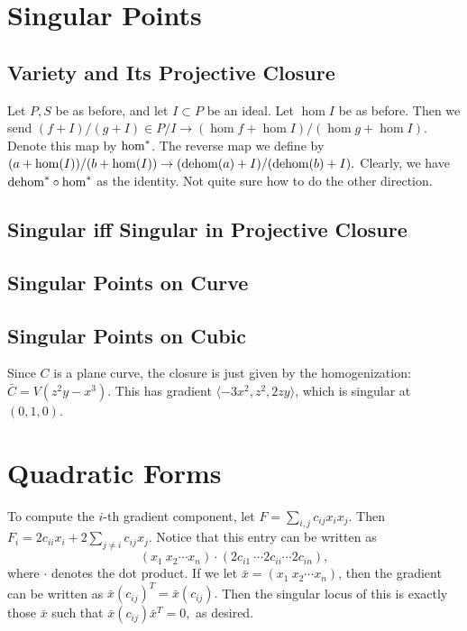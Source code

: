 \section{Singular Points}
\subsection{Variety and Its Projective Closure}
Let $P, S$ be as before, and let $I \subset P$ be an ideal. Let $\hom I$ be as before. Then we send $(f + I)/(g + I) \in P/I \rightarrow (\hom f + \hom I)/(\hom g + \hom I)$. Denote this map by $\mathrm{hom}^*$. The reverse map we define by $(a + \mathrm{hom}(I))/(b + \mathrm{hom}(I)) \rightarrow (\mathrm{dehom}(a) + I)/(\mathrm{dehom}(b) + I).$ Clearly, we have $\mathrm{dehom}^* \circ \mathrm{hom}^*$ as the identity. Not quite sure how to do the other direction.

\subsection{Singular iff Singular in Projective Closure}

\subsection{Singular Points on Curve}

\subsection{Singular Points on Cubic}
Since $C$ is a plane curve, the closure is just given by the homogenization: $\bar{C} = V(z^2 y - x^3).$ This has gradient $\langle -3x^2, z^2, 2zy \rangle$, which is singular at $(0, 1, 0)$.

\section{Quadratic Forms}
To compute the $i$-th gradient component, let $F = \sum_{i, j} c_{ij} x_i x_j$. Then $F_i = 2 c_{ii} x_i + 2 \sum_{j \neq i} c_{ij} x_j$. Notice that this entry can be written as \[(x_1 \ x_2 \cdots x_n) \cdot (2c_{i1} \ \cdots 2c_{ii} \cdots 2c_{in}),\] where $\cdot$ denotes the dot product. If we let $\bar{x} = (x_1 \ x_2 \cdots x_n)$, then the gradient can be written as $\bar{x} (c_{ij})^T = \bar{x} (c_{ij}).$ Then the singular locus of this is exactly those $\bar{x}$ such that $\bar{x} (c_{ij}) \bar{x}^T = 0,$ as desired.